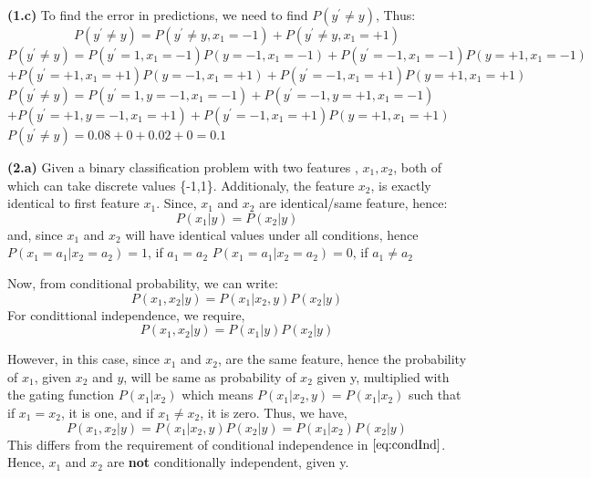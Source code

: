 \documentclass{article}
\renewcommand\part[1]{\vspace{.10in}\textbf{(#1)}}
\begin{document}
  \part{1.c} To find the error in predictions, we need to find $P(y^\prime \neq y)$, Thus:
  \[ P(y^\prime \neq y) = P(y^\prime \neq y, x_1 = -1) + P(y^\prime \neq y, x_1 = +1)\]
  $P(y^\prime \neq y) = P(y^\prime = 1,x_1 = -1)P(y=-1,x_1=-1) + P(y^\prime =-1,x_1 = -1)P(y=+1,x_1=-1)$ \newline
	$ + P(y^\prime = +1, x_1 = +1)P(y=-1, x_1 = +1) + P(y^\prime = -1, x_1 = +1)P(y=+1, x_1 = +1)$ \newline
  $P(y^\prime \neq y) = P(y^\prime = 1,y=-1,x_1 = -1) + P(y^\prime =-1,y=+1,x_1 = -1)$ \newline
	$ + P(y^\prime = +1,y=-1, x_1 = +1) + P(y^\prime = -1, x_1 = +1)P(y=+1, x_1 = +1)$ \newline
  $P(y^\prime \neq y) = 0.08 + 0 + 0.02 + 0 = 0.1 $


 \part{2.a} Given a binary classification problem with two features , $x_1,x_2$, both of which can take discrete values \{-1,1\}. Additionaly, the feature $x_2$, is exactly identical to first feature $x_1$. \newline
	Since, $x_1$ and $x_2$ are identical/same feature, hence:
	\[P(x_1 |y) = P(x_2|y)\]
	and, since $x_1$ and $x_2$ will have identical values under all conditions, hence\newline
	$P(x_1 = a_1 | x_2 = a_2) = 1$, if $a_1 = a_2$ \newline
	$P(x_1 = a_1 | x_2 = a_2) = 0$, if $a_1 \neq a_2$ \newline

	Now, from conditional probability, we can write:
	\[P(x_1,x_2 | y) = P(x_1 | x_2,y) P(x_2 | y)\]
	For condittional independence, we require,
	\begin{equation}
		P(x_1,x_2 | y) = P(x_1 | y) P(x_2|y)
		\label{eq:condInd}
	\end{equation}

	However, in this case, since $x_1$ and $x_2$, are the same feature, hence the probability of $x_1$, given $x_2$ and $y$, will be same as probability of $x_2$ given y, multiplied with the gating function $P(x_1 | x_2)$ which means $P(x_1 | x_2,y) = P(x_1 | x_2)$ such that if $x_1=x_2$, it is one, and if $x_1 \neq x_2$, it is zero. Thus, we have,
	\[P(x_1,x_2 | y) = P(x_1 | x_2,y) P(x_2 | y) = P(x_1 | x_2) P(x_2|y)\]
	This differs from the requirement of conditional independence in $\eqref{eq:condInd}$. Hence, $x_1$ and $x_2$ are \textbf {not} conditionally independent, given y. 
\end{document}
